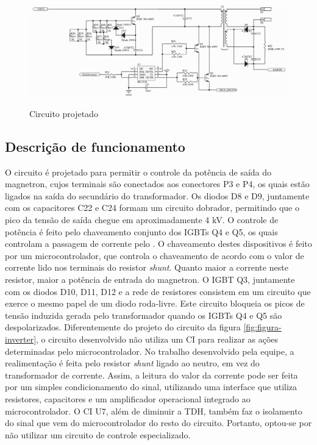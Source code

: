 \begin{figure}[!htb]
    \centering
    \caption{Circuito projetado}
    \includegraphics[width=1.1\textwidth]{./dados/figuras/proj-font-inv}
    \label{fig:proj-font-inv}
\end{figure}

\subsection{Descrição de funcionamento}
O circuito é projetado para permitir o controle da potência de saída do magnetron, cujos terminais são conectados aos conectores P3 e P4, os quais estão ligados na saída do secundário do transformador. Os diodos D8 e D9, juntamente com os capacitores C22 e C24 formam um circuito dobrador,  permitindo que o pico da tensão de saída chegue em aproximadamente 4 kV. O controle de potência é feito pelo chaveamento conjunto dos IGBTs Q4 e Q5, os quais controlam a passagem de corrente pelo . O chaveamento destes dispositivos é feito por um microcontrolador, que controla o chaveamento de acordo com o valor de corrente lido nos terminais do resistor \textit{shunt}. Quanto maior a corrente neste resistor, maior a potência de entrada do magnetron. O IGBT Q3, juntamente com os diodos D10, D11, D12 e a rede de resistores consistem em um circuito que exerce o mesmo papel de um diodo roda-livre. Este circuito bloqueia os picos de tensão induzida gerada pelo transformador quando os IGBTs Q4 e Q5 são despolarizados.
Diferentemente do projeto do circuito  da figura \ref{fig:figura-inverter}, o circuito desenvolvido não utiliza um CI para realizar as ações determinadas pelo microcontrolador. No trabalho desenvolvido pela equipe, a realimentação é feita pelo resistor \textit{shunt} ligado ao neutro, em vez do transformador de corrente. Assim, a leitura do valor da corrente pode ser feita por um simples condicionamento do sinal, utilizando uma interface que utiliza resistores, capacitores e um amplificador operacional integrado ao microcontrolador. O CI U7, além de diminuir a TDH, também faz o isolamento do sinal que vem do microcontrolador do resto do circuito. Portanto, optou-se por não utilizar um circuito de controle especializado.



